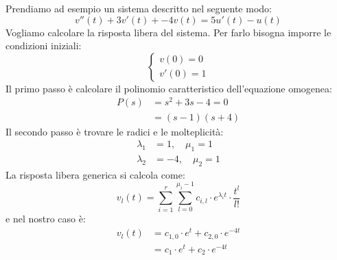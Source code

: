 \documentclass[a4paper]{article}
\begin{document}
\begin{example}
  Prendiamo ad esempio un sistema descritto nel seguente modo:
  \[
    v''(t) + 3v'(t) + -4v(t) = 5u'(t) - u(t)
  \] 
  Vogliamo calcolare la risposta libera del sistema. Per farlo bisogna imporre le
  condizioni iniziali:
  \[
    \begin{cases}
      v(0) = 0\\
      v'(0) = 1
    \end{cases}
  \] 
  Il primo passo è calcolare il polinomio caratteristico dell'equazione omogenea:
  \[
    \begin{aligned}
      P(s) &= s^2 + 3s - 4 = 0\\
           &= (s-1) (s+4)
    \end{aligned}
  \] 
  Il secondo passo è trovare le radici e le molteplicità:
  \[
    \begin{aligned}
      \lambda_1 &= 1, \quad \mu_1 = 1\\
      \lambda_2 &= -4, \quad \mu_2 = 1
    \end{aligned}
  \]
  La risposta libera generica si calcola come:
  \[
    v_l(t) = \sum_{i=1}^{r} \sum_{l=0}^{\mu_i -1} c_{i,l} \cdot e^{\lambda_i t} \cdot
    \frac{t^l}{l!}
  \] 
  e nel nostro caso è:
  \[
    \begin{aligned}
      v_l(t) &= c_{1,0} \cdot e^{t} + c_{2,0} \cdot e^{-4t}\\
             &= c_1 \cdot e^{t} + c_2 \cdot e^{-4t}
    \end{aligned}
  \] 


\end{example}
\end{document}
